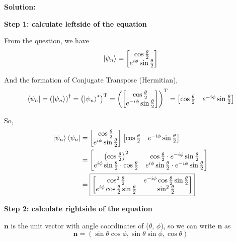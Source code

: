 \documentclass[11pt]{article}
\newenvironment{solution}
{\par\noindent\textbf{Solution:}\par}
{\vspace{1em}}
\begin{document}
\begin{solution}

\textbf{Step 1: calculate leftside of the equation}

From the question, we have \[\ket{\psi_n} = \begin{bmatrix}\cos{\frac{\theta}{2}} \\ e^{i\phi}\sin{\frac{\theta}{2}}\end{bmatrix}\]

And the formation of Conjugate Transpose (Hermitian), \[\bra{\psi_n} = \left(\ket{\psi_n}\right)^\dagger = \left(\ket{\psi_n}^*\right)^{\mathrm{T}} = \left(\begin{bmatrix}\cos{\frac{\theta}{2}} \\ e^{-i\phi}\sin{\frac{\theta}{2}}\end{bmatrix}\right)^{\mathrm{T}} = \begin{bmatrix}\cos{\frac{\theta}{2}} & e^{-i\phi}\sin{\frac{\theta}{2}}\end{bmatrix}\]

So, 
\[\begin{aligned}
\ket{\psi_n}\bra{\psi_n} &= \begin{bmatrix}\cos{\frac{\theta}{2}} \\ e^{i\phi}\sin{\frac{\theta}{2}}\end{bmatrix} \begin{bmatrix}\cos{\frac{\theta}{2}} & e^{-i\phi}\sin{\frac{\theta}{2}}\end{bmatrix} \\
&= \begin{bmatrix}\left(\cos{\frac{\theta}{2}}\right)^2 & \cos{\frac{\theta}{2}} \cdot e^{-i\phi}\sin{\frac{\theta}{2}} \\ e^{i\phi}\sin{\frac{\theta}{2}} \cdot \cos{\frac{\theta}{2}} & e^{i\phi}\sin{\frac{\theta}{2}} \cdot e^{-i\phi}\sin{\frac{\theta}{2}}\end{bmatrix} \\
&= \boxed{\begin{bmatrix}\cos^2{\frac{\theta}{2}} & e^{-i\phi}\cos{\frac{\theta}{2}}\sin{\frac{\theta}{2}} \\ e^{i\phi}\cos{\frac{\theta}{2}}\sin{\frac{\theta}{2}} & \sin^2{\frac{\theta}{2}}\end{bmatrix}}
\end{aligned}\]

\textbf{Step 2: calculate rightside of the equation}

$\mathbf{n}$ is the unit vector with angle coordinates of ($\theta$, $\phi$), so we can write $\mathbf{n}$ as \[\mathbf{n} = \left(\sin{\theta}\cos{\phi}, \sin{\theta}\sin{\phi}, \cos{\theta}\right)\]


\end{solution}
\end{document}
